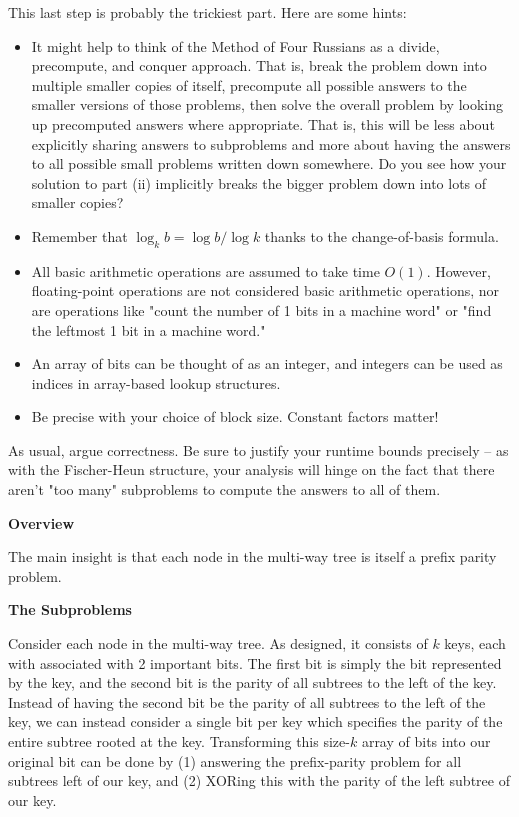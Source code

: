 \documentclass[12pt]{exam}
\newcommand*{\bigo}[1]{O\left( #1 \right)}
\begin{document}
\begin{questions}
\begin{parts}
This last step is probably the trickiest part. Here are some hints:

\begin{itemize}
    \item It might help to think of the Method of Four Russians as a divide, precompute, and conquer approach. That is, break the problem down into multiple smaller copies of itself, precompute all possible answers to the smaller versions of those problems, then solve the overall problem by looking up precomputed answers where appropriate. That is, this will be less about explicitly sharing answers to subproblems and more about having the answers to all possible small problems written down somewhere. Do you see how your solution to part (ii) implicitly breaks the bigger problem down into lots of smaller copies?
    \item Remember that $\log_k b = \log b / \log k$ thanks to the change-of-basis formula.
    \item All basic arithmetic operations are assumed to take time $\bigo{1}$. However, floating-point operations are not considered basic arithmetic operations, nor are operations like "count the number of 1 bits in a machine word" or "find the leftmost 1 bit in a machine word."
    \item An array of bits can be thought of as an integer, and integers can be used as indices in array-based lookup structures.
    \item Be precise with your choice of block size. Constant factors matter!
\end{itemize}

As usual, argue correctness. Be sure to justify your runtime bounds precisely -- as with the Fischer-Heun structure, your analysis will hinge on the fact that there aren't "too many" subproblems to compute the answers to all of them.

\begin{solution}
\textbf{Overview}

The main insight is that each node in the multi-way tree is itself a prefix parity problem. 

\textbf{The Subproblems}

Consider each node in the multi-way tree. As designed, it consists of $k$ keys, each with associated with 2 important bits. The first bit is simply the bit represented by the key, and the second bit is the parity of all subtrees to the left of the key. Instead of having the second bit be the parity of all subtrees to the left of the key, we can instead consider a single bit per key which specifies the parity of the entire subtree rooted at the key. Transforming this size-$k$ array of bits into our original bit can be done by (1) answering the prefix-parity problem for all subtrees left of our key, and (2) XORing this with the parity of the left subtree of our key.



\end{solution}
\end{parts}
\end{questions}
\end{document}
